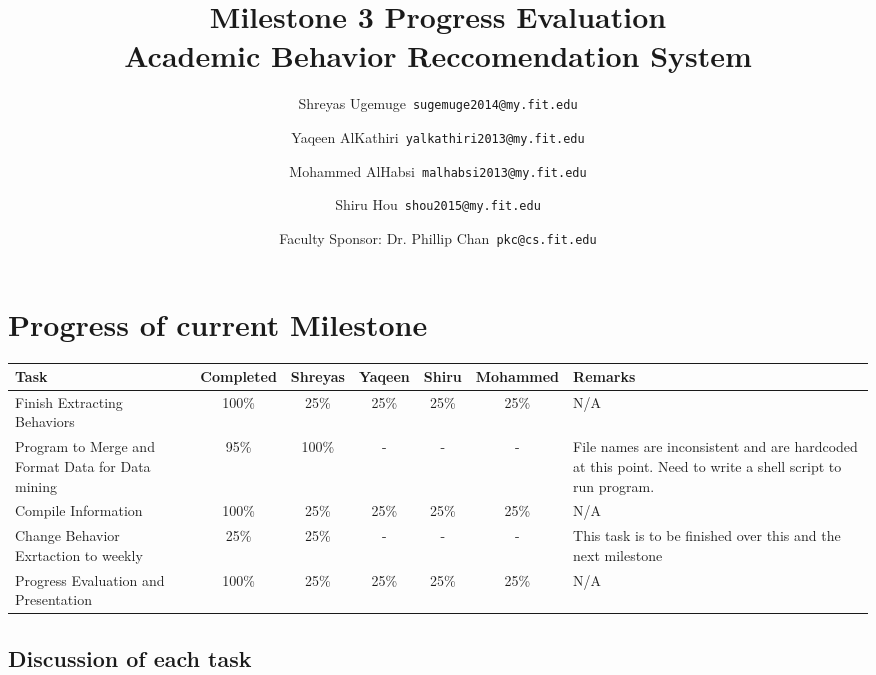 \documentclass[12pt]{article}
\begin{document}
	\title{\textbf{Milestone 3 Progress Evaluation} \\ \hfill \break
	Academic Behavior Reccomendation System}
	\author{Shreyas Ugemuge\      \texttt{sugemuge2014@my.fit.edu}
  \and
  Yaqeen AlKathiri\      \texttt{yalkathiri2013@my.fit.edu}
  \and
	Mohammed AlHabsi\      \texttt{malhabsi2013@my.fit.edu}
  \and
  Shiru Hou\      \texttt{shou2015@my.fit.edu}
  \and
  Faculty Sponsor: Dr. Phillip Chan\      \texttt{pkc@cs.fit.edu}}
	\maketitle
	\pagebreak
	\singlespacing
	\tableofcontents
	\pagebreak
	\section{Progress of current Milestone}
	\begin{tabularx}{\textwidth}{|X|c|c|c|c|c|X|}
	\hline
		\textbf{Task} & \textbf{Completed} &\textbf{Shreyas} & \textbf{Yaqeen} & \textbf{Shiru} & \textbf{Mohammed} & \textbf{Remarks}  \\ \hline
		Finish Extracting Behaviors &100\% & 25\% & 25\% & 25\% & 25\% & N/A \\ \hline
		Program to Merge and Format Data for Data mining & 95\% & 100\% & - & - & - & File names are inconsistent and are hardcoded at this point. Need to write a shell script to run program. \\ \hline
		Compile Information & 100\% & 25\% & 25\% & 25\% & 25\% & N/A \\ \hline
		Change Behavior Exrtaction to weekly & 25\% & 25\% & - & - & - & This task is to be finished over this and the next milestone \\ \hline
		Progress Evaluation and Presentation & 100\% & 25\% & 25\% & 25\% & 25\% & N/A \\ \hline
	\end{tabularx}
	\subsection{Discussion of each task}
\end{document}
